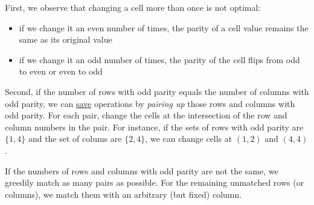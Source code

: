 % 

First, we observe that changing a cell more than once is not optimal:
\begin{itemize}
  \item if we change it an even number of times, the parity of a cell value remains the same as its original value
  \item if we change it an odd number of times, the parity of the cell flips from odd to even or even to odd
\end{itemize}

Second, if the number of rows with odd parity equals the number of columns with odd parity, we can \underline{save} operations by \textit{pairing up} those rows and columns with odd parity. For each pair, change the cells at the intersection of the row and column numbers in the pair.  For instance, if the sets of rows with odd parity are $\{1, 4\}$ and the set of colums are $\{2, 4\}$, we can change cells at $(1, 2)$ and $(4, 4)$.

If the numbers of rows and columns with odd parity are not the same, we greedily match as many pairs as possible. For the remaining unmatched rows (or columns), we match them with an arbitrary (but fixed) column.
